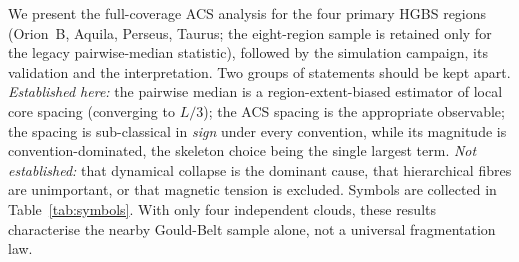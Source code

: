 \documentclass[usenatbib,twoside,twocolumn]{mnras}
\begin{document}
We present the full-coverage ACS analysis for the four primary HGBS regions (Orion~B, Aquila, Perseus, Taurus; the eight-region sample is retained only for the legacy pairwise-median statistic), followed by the simulation campaign, its validation and the interpretation. Two groups of statements should be kept apart. \emph{Established here:} the pairwise median is a region-extent-biased estimator of local core spacing (converging to $L/3$); the ACS spacing is the appropriate observable; the spacing is sub-classical in \emph{sign} under every convention, while its magnitude is convention-dominated, the skeleton choice being the single largest term. \emph{Not established:} that dynamical collapse is the dominant cause, that hierarchical fibres are unimportant, or that magnetic tension is excluded. Symbols are collected in Table~\ref{tab:symbols}. With only four independent clouds, these results characterise the nearby Gould-Belt sample alone, not a universal fragmentation law.
\end{document}
